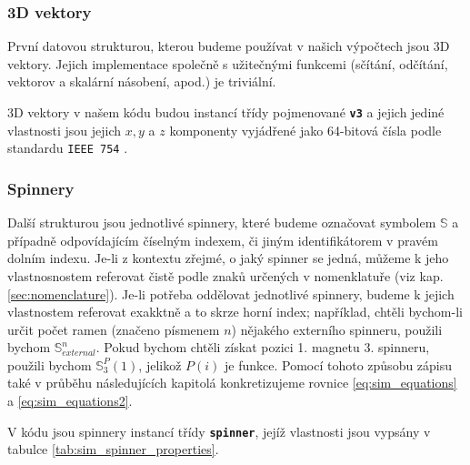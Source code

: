 \documentclass[12pt, a4paper,
 twoside,        %
 openright
]{report}
\begin{document}
\subsubsection{3D vektory}

První datovou strukturou, kterou budeme používat v našich výpočtech jsou 3D vektory. Jejich implementace společně s užitečnými funkcemi (sčítání, odčítání, vektorov a skalární násobení, apod.) je triviální. 

3D vektory v našem kódu budou instancí třídy pojmenované \textbf{\texttt{v3}} a jejich jediné vlastnosti jsou jejich $x,y$ a $z$ komponenty vyjádřené jako 64-bitová čísla podle standardu \texttt{IEEE 754} \cite{IEEE-754}.

\subsubsection{Spinnery}

Další strukturou jsou jednotlivé spinnery, které budeme označovat symbolem $\mathbb{S}$ a případně odpovídajícím číselným indexem, či jiným identifikátorem v pravém dolním indexu. Je-li z kontextu zřejmé, o jaký spinner se jedná, můžeme k jeho vlastnosnostem referovat čistě podle znaků určených v nomenklatuře (viz kap. \ref{sec:nomenclature}). Je-li potřeba oddělovat jednotlivé spinnery, budeme k jejich vlastnostem referovat exakktně a to skrze horní index; například, chtěli bychom-li určit počet ramen (značeno písmenem $n$) nějakého externího spinneru, použili bychom $\mathbb{S}_{external}^{n}$. Pokud bychom chtěli získat pozici 1. magnetu 3. spinneru, použili bychom $\mathbb{S}_{3}^{P}(1)$, jelikož $P(i)$ je funkce. Pomocí tohoto způsobu zápisu také v průběhu následujících kapitolá konkretizujeme rovnice \ref{eq:sim_equations} a \ref{eq:sim_equations2}.

V kódu jsou spinnery instancí třídy \textbf{\texttt{spinner}}, jejíž vlastnosti jsou vypsány v tabulce \ref{tab:sim_spinner_properties}.
\end{document}
